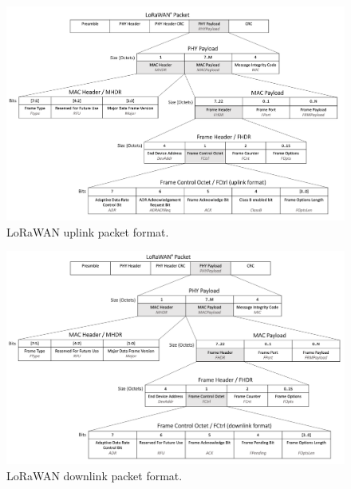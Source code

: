 \begin{figure}[ht]
    \centering
    \includegraphics[width=1.0\textwidth, trim={0 0 0 125pt}, clip]{uml/lorawan_uplink_format.pdf}
    \caption{LoRaWAN uplink packet format.}
    \label{img: lorawan uplink format}
\end{figure}

\begin{figure}[ht]
    \centering
    \includegraphics[width=1.0\textwidth, trim={0 0 0 115pt}, clip]{uml/lorawan_downlink_format.pdf}
    \caption{LoRaWAN downlink packet format.}
    \label{img: lorawan downlink format}
\end{figure}


